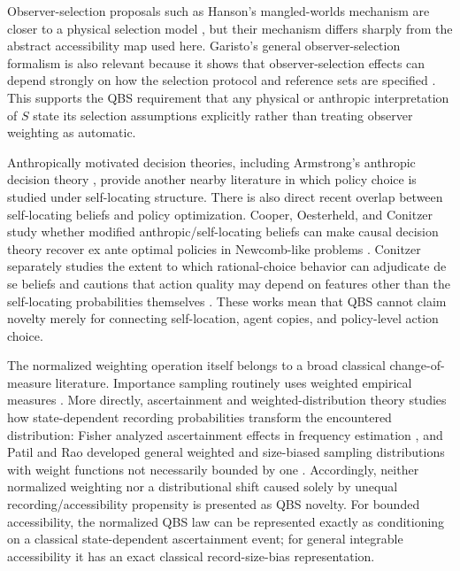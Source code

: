 Observer-selection proposals such as Hanson's mangled-worlds mechanism are closer to a physical selection model \cite{hanson2003mangled}, but their mechanism differs sharply from the abstract accessibility map used here. Garisto's general observer-selection formalism is also relevant because it shows that observer-selection effects can depend strongly on how the selection protocol and reference sets are specified \cite{garisto2020selectobservers}. This supports the QBS requirement that any physical or anthropic interpretation of $S$ state its selection assumptions explicitly rather than treating observer weighting as automatic.

Anthropically motivated decision theories, including Armstrong's anthropic decision theory \cite{armstrong2011anthropic}, provide another nearby literature in which policy choice is studied under self-locating structure. There is also direct recent overlap between self-locating beliefs and policy optimization. Cooper, Oesterheld, and Conitzer study whether modified anthropic/self-locating beliefs can make causal decision theory recover ex ante optimal policies in Newcomb-like problems \cite{cooperoesterheldconitzer2024anthropics}. Conitzer separately studies the extent to which rational-choice behavior can adjudicate de se beliefs and cautions that action quality may depend on features other than the self-locating probabilities themselves \cite{conitzer2015dese}. These works mean that QBS cannot claim novelty merely for connecting self-location, agent copies, and policy-level action choice.

The normalized weighting operation itself belongs to a broad classical change-of-measure literature. Importance sampling routinely uses weighted empirical measures \cite{hultnyquist2016importance}. More directly, ascertainment and weighted-distribution theory studies how state-dependent recording probabilities transform the encountered distribution: Fisher analyzed ascertainment effects in frequency estimation \cite{fisher1934ascertainment}, and Patil and Rao developed general weighted and size-biased sampling distributions with weight functions not necessarily bounded by one \cite{patilrao1978weighted}. Accordingly, neither normalized weighting nor a distributional shift caused solely by unequal recording/accessibility propensity is presented as QBS novelty. For bounded accessibility, the normalized QBS law can be represented exactly as conditioning on a classical state-dependent ascertainment event; for general integrable accessibility it has an exact classical record-size-bias representation.

